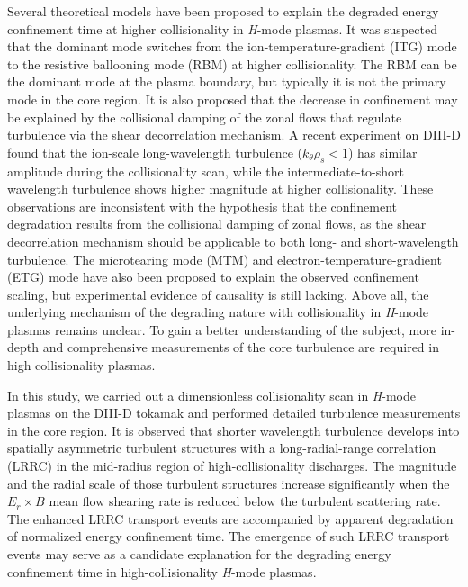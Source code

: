 \documentclass[english,aip,pop,superscriptaddress,preprint,letterpaper]{revtex4-2}
\begin{document}
Several theoretical models have been proposed to explain the degraded energy confinement time at higher collisionality in \emph{H}-mode plasmas.
It was suspected that the dominant mode switches from the ion-temperature-gradient (ITG) mode to the resistive ballooning mode (RBM) at higher collisionality.
The RBM can be the dominant mode at the plasma boundary, but typically it is not the primary mode in the core region.
It is also proposed that the decrease in confinement may be explained by the collisional damping of the zonal flows that regulate turbulence via the shear decorrelation mechanism.
A recent experiment on DIII-D found that the ion-scale long-wavelength turbulence ($k_{\theta}\rho_{s}<1$) has similar amplitude during the collisionality scan, while the intermediate-to-short wavelength turbulence shows higher magnitude at higher collisionality.\cite{mordijckCollisionalityDrivenTurbulent2020}
These observations are inconsistent with the hypothesis that the confinement degradation results from the collisional damping of zonal flows, as the shear decorrelation mechanism should be applicable to both long- and short-wavelength turbulence. 
The microtearing mode\cite{guttenfelderElectromagneticTransportMicrotearing2011} (MTM) and electron-temperature-gradient (ETG) mode\cite{colyerCollisionalityScalingElectron2017} have also been proposed to explain the observed confinement scaling, but experimental evidence of causality is still lacking.
Above all, the underlying mechanism of the degrading nature with collisionality in \emph{H}-mode plasmas remains unclear.
To gain a better understanding of the subject, more in-depth and comprehensive measurements of the core turbulence are required in high collisionality plasmas.

In this study, we carried out a dimensionless collisionality scan in \emph{H}-mode plasmas on the DIII-D tokamak and performed detailed turbulence measurements in the core region.
It is observed that shorter wavelength turbulence develops into spatially asymmetric turbulent structures with a long-radial-range correlation (LRRC) in the mid-radius region of high-collisionality discharges. 
The magnitude and the radial scale of those turbulent structures increase significantly when the $E_{r}\times B$ mean flow shearing rate is reduced below the turbulent scattering rate. 
The enhanced LRRC transport events are accompanied by apparent degradation of normalized energy confinement time.
The emergence of such LRRC transport events may serve as a candidate explanation for the degrading energy confinement time in high-collisionality \emph{H}-mode plasmas.
\end{document}
